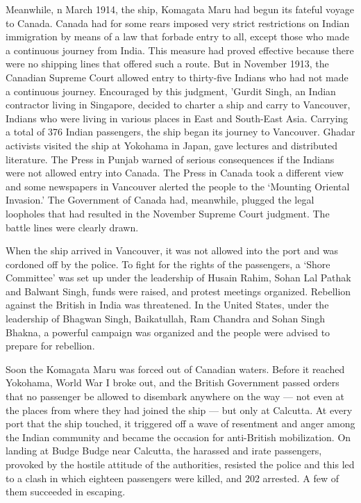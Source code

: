 Meanwhile, n March 1914, the ship, Komagata Maru had begun its fateful voyage to Canada. Canada had for some rears imposed very strict restrictions on Indian immigration by means of a law that forbade entry to all, except those who made a continuous journey from India. This measure had proved effective because there were no shipping lines that offered such a route. But in November 1913, the Canadian Supreme Court allowed entry to thirty-five Indians who had not made a continuous journey. Encouraged by this judgment, 'Gurdit Singh, an Indian contractor living in Singapore, decided to charter a ship and carry to Vancouver, Indians who were living in various places in East and South-East Asia. Carrying a total of 376 Indian passengers, the ship began its journey to Vancouver. Ghadar activists visited the ship at Yokohama in Japan, gave lectures and distributed literature. The Press in Punjab warned of serious consequences if the Indians were not allowed entry into Canada. The Press in Canada took a different view and some newspapers in Vancouver alerted the people to the `Mounting Oriental Invasion.' The Government of Canada had, meanwhile, plugged the legal loopholes that had resulted in the November Supreme Court judgment. The battle lines were clearly drawn.

When the ship arrived in Vancouver, it was not allowed into the port and was cordoned off by the police. To fight for the rights of the passengers, a `Shore Committee' was set up under the leadership of Husain Rahim, Sohan Lal Pathak and Balwant Singh, funds were raised, and protest meetings organized. Rebellion against the British in India was threatened. In the United States, under the leadership of Bhagwan Singh, Baikatullah, Ram Chandra and Sohan Singh Bhakna, a powerful campaign was organized and the people were advised to prepare for rebellion.

Soon the Komagata Maru was forced out of Canadian waters. Before it reached Yokohama, World War I broke out, and the British Government passed orders that no passenger be allowed to disembark anywhere on the way --- not even at the places from where they had joined the ship --- but only at Calcutta. At every port that the ship touched, it triggered off a wave of resentment and anger among the Indian community and became the occasion for anti-British mobilization. On landing at Budge Budge near Calcutta, the harassed and irate passengers, provoked by the hostile attitude of the authorities, resisted the police and this led to a clash in which eighteen passengers were killed, and 202 arrested. A few of them succeeded in escaping.

